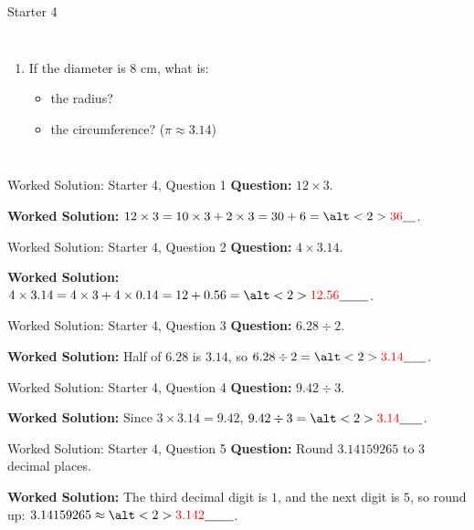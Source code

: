 \documentclass{beamer}
\newcommand{\ablank}[1]{%
  \alt<2>{\textcolor{red}{#1}}{\underline{\phantom{#1}}}%
}
\newcommand{\ashow}[1]{\uncover<2->{\textcolor{red}{\small #1}}}
\begin{document}
\begin{frame}{Starter 4}
\begin{columns}
\begin{enumerate}
  \item If the diameter is $8$ cm, what is:
    \begin{itemize}
      \item the radius? \ashow{$4$ cm}
      \item the circumference? ($\pi \approx 3.14$) \ashow{$25.12$ cm}
    \end{itemize}
 
\end{enumerate}

\end{columns}
\end{frame}

\begin{frame}{Worked Solution: Starter 4, Question 1}
\hypertarget{work-st4}{}
\small
\textbf{Question:} \(12\times3\).

\textbf{Worked Solution:} \(12\times3=10\times3+2\times3=30+6=\ablank{36}\).
\end{frame}

\begin{frame}{Worked Solution: Starter 4, Question 2}
\small
\textbf{Question:} \(4\times3.14\).

\textbf{Worked Solution:} \(4\times3.14=4\times3+4\times0.14=12+0.56=\ablank{12.56}\).
\end{frame}

\begin{frame}{Worked Solution: Starter 4, Question 3}
\small
\textbf{Question:} \(6.28\div2\).

\textbf{Worked Solution:} Half of \(6.28\) is \(3.14\), so \(6.28\div2=\ablank{3.14}\).
\end{frame}

\begin{frame}{Worked Solution: Starter 4, Question 4}
\small
\textbf{Question:} \(9.42\div3\).

\textbf{Worked Solution:} Since \(3\times3.14=9.42\), \(9.42\div3=\ablank{3.14}\).
\end{frame}

\begin{frame}{Worked Solution: Starter 4, Question 5}
\small
\textbf{Question:} Round \(3.14159265\) to 3 decimal places.

\textbf{Worked Solution:} The third decimal digit is \(1\), and the next digit is \(5\), so round up:
\(3.14159265\approx\ablank{3.142}\).
\end{frame}
\end{document}
